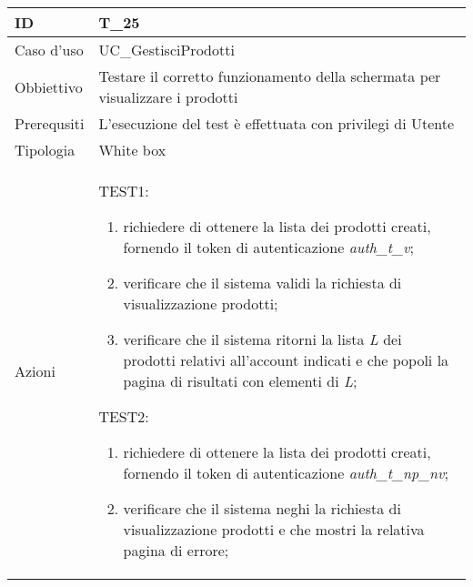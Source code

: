 \begin{table}[hb]
    \centering
    \begin{tabular}{ |p{2cm}|p{10cm}|  }
        \hline

        ID          & T\_25                                                                      \\\hline
        Caso d'uso  & UC\_GestisciProdotti                                                      \\\hline
        Obbiettivo  & Testare il corretto funzionamento della schermata per visualizzare i prodotti  \\\hline
        Prerequsiti & L'esecuzione del test è effettuata con privilegi di Utente                 \\\hline
        Tipologia   & White box                                                                  \\\hline
        Azioni      &
        TEST1:
        \begin{enumerate}[nosep, topsep=0pt]
            \item richiedere di ottenere la lista dei prodotti creati, fornendo il token di autenticazione \emph{auth\_t\_v};
            \item verificare che il sistema validi la richiesta di visualizzazione prodotti;
            \item verificare che il sistema ritorni la lista \emph{L} dei prodotti relativi all'account indicati e che popoli la pagina di risultati con elementi di \emph{L};
        \end{enumerate}
        \vspace{0.5cm} TEST2:
        \begin{enumerate}[nosep, topsep=0pt]
            \item richiedere di ottenere la lista dei prodotti creati, fornendo il token di autenticazione \emph{auth\_t\_np\_nv};
            \item verificare che il sistema neghi la richiesta di visualizzazione prodotti e che mostri la relativa pagina di errore;
        \end{enumerate}
        \\\hline
    \end{tabular}
\end{table}

